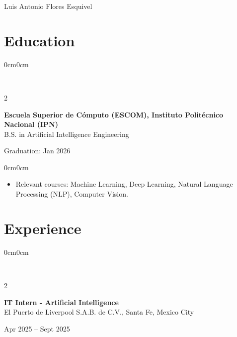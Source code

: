 \documentclass[10pt, letterpaper]{article}
\newenvironment{highlights}{
	\begin{itemize}[topsep=0pt,itemsep=1pt,leftmargin=10pt]
	}{
	\end{itemize}
}
\newenvironment{onecolentry}{
	\begin{adjustwidth}{0cm}{0cm}
	}{
	\end{adjustwidth}
	\vspace{0pt}
}
\newenvironment{twocolentry}[1]{
	\onecolentry
	\columnratio{0.75} 
	\begin{paracol}{2}
		\raggedright #1
		\switchcolumn
	}{
	\end{paracol}
	\endonecolentry
}
\newenvironment{header}{
	\centering\linespread{1.4}
}{}
\begin{document}
	
	\begin{header}
		{\fontsize{20pt}{20pt}\selectfont Luis Antonio Flores Esquivel}
		
		\vspace{6pt}
		
	\end{header}
	
	
	\section{Education}
	
	\begin{twocolentry}{\textbf{Escuela Superior de Cómputo (ESCOM), Instituto Politécnico Nacional (IPN)}\\
	B.S. in Artificial Intelligence Engineering}
	{Graduation: Jan 2026}
	\end{twocolentry}
	
	\begin{onecolentry}
		\begin{highlights}
			\item Relevant courses: Machine Learning, Deep Learning, Natural Language Processing (NLP), Computer Vision.
		\end{highlights}
	\end{onecolentry}
	
	\section{Experience}
	
	\begin{twocolentry}
		{\textbf{IT Intern - Artificial Intelligence}
			\\ El Puerto de Liverpool S.A.B. de C.V., Santa Fe, Mexico City} 
			{Apr 2025 -- Sept 2025}
	\end{twocolentry}
	
\end{document}
